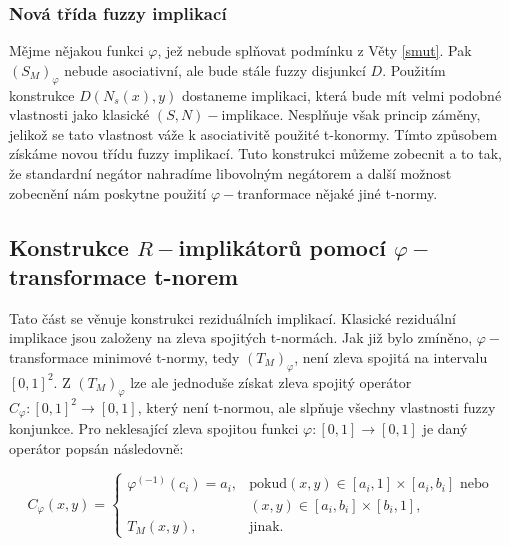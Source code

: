 \subsubsection{Nová třída fuzzy implikací}
Mějme nějakou funkci $\varphi$, jež nebude spl\v novat podmínku z Věty \ref{smut}. Pak $(S_M)_{\varphi}$ nebude asociativní, ale bude stále fuzzy disjunkcí $D.$ Použitím konstrukce $D(N_s(x),y)$ dostaneme implikaci, která bude mít velmi podobné vlastnosti jako klasické $(S,N)-$implikace. Nespl\v nuje však princip záměny, jelikož se tato vlastnost váže k asociativitě použité t-konormy. Tímto způsobem získáme novou třídu fuzzy implikací. Tuto konstrukci můžeme zobecnit a to tak, že standardní negátor nahradíme libovolným negátorem a další možnost zobecnění nám poskytne použití $\varphi-$tranformace nějaké jiné t-normy.


\subsection{Konstrukce $R-$implik\'ator\r u pomoc\'i $\varphi-$transformace t-norem}
Tato část se věnuje konstrukci reziduálních implikací. Klasické reziduální implikace jsou založeny na zleva spojitých t-normách. Jak již bylo zmíněno, $\varphi-$transformace minimové t-normy, tedy $(T_M)_\varphi$, není zleva spojitá na intervalu $[0,1]^2$. Z $(T_M)_\varphi$ lze ale jednoduše získat zleva spojitý operátor $C_\varphi:[0,1]^2 \to [0,1]$, který není t-normou, ale slp\v nuje všechny vlastnosti fuzzy konjunkce. Pro neklesající zleva spojitou funkci $\varphi: [0,1] \to [0,1]$ je daný operátor popsán následovně:\cite{mitav}

\begin{equation} \label{rez}
    C_{\varphi}(x,y) = \begin{cases} \varphi^{(-1)}(c_i)=a_i, &\mbox {pokud
$(x,y)\in [a_i,1]\times[a_i,b_i]$ nebo}
\\ & (x,y)\in [a_i,b_i]\times[b_i,1],
\\ T_M(x,y), &\mbox {jinak.}
\end{cases} 
\end{equation} 



